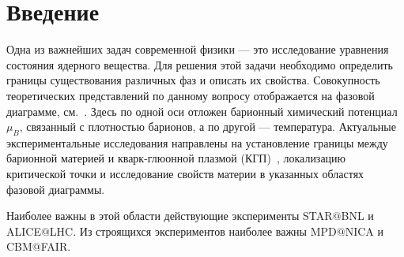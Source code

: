 \chapter*{Введение}\label{sec:secIntro}


Одна из важнейших задач современной физики --- это исследование уравнения состояния ядерного вещества. Для решения этой задачи необходимо определить границы существования различных фаз и описать их свойства. Совокупность теоретических представлений по данному вопросу отображается на фазовой диаграмме, см.~.
Здесь по одной оси отложен барионный химический потенциал $\mu_{B}$, связанный с плотностью барионов, а по другой --- температура. Актуальные экспериментальные исследования направлены на установление границы между барионной материей и кварк-глюонной плазмой (КГП)~\cite{}, локализацию критической точки и исследование свойств материи в указанных областях фазовой диаграммы.

Наиболее важны в этой области действующие эксперименты STAR$@$BNL и ALICE$@$LHC. Из строящихся экспериментов наиболее важны MPD$@$NICA и CBM$@$FAIR.




